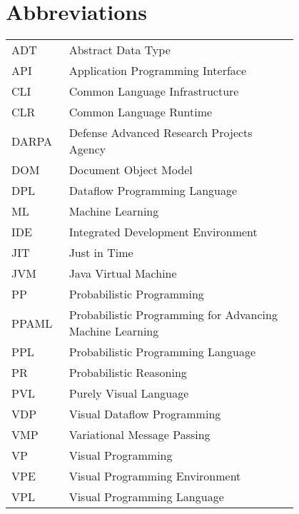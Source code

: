 \chapter*{Abbreviations}

\begin{flushleft}
\begin{tabular}{l p{0.8\linewidth}}
ADT      & Abstract Data Type\\
API      & Application Programming Interface\\
CLI      & Common Language Infrastructure\\
CLR      & Common Language Runtime\\
DARPA    & Defense Advanced Research Projects Agency\\
DOM      & Document Object Model\\
DPL      & Dataflow Programming Language\\
ML       & Machine Learning\\
IDE      & Integrated Development Environment\\
JIT      & Just in Time\\
JVM      & Java Virtual Machine\\
PP       & Probabilistic Programming\\
PPAML    & Probabilistic Programming for Advancing Machine Learning\\
PPL      & Probabilistic Programming Language\\
PR       & Probabilistic Reasoning\\
PVL      & Purely Visual Language\\
VDP      & Visual Dataflow Programming\\
VMP      & Variational Message Passing\\
VP       & Visual Programming\\
VPE      & Visual Programming Environment\\
VPL      & Visual Programming Language
\end{tabular}
\end{flushleft}
